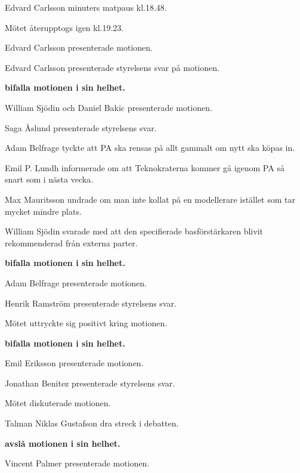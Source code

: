 \documentclass[10pt]{article}
\begin{document}
\begin{paragrafer}
\Mbaby

Edvard Carlsson  minuters matpaus kl.18.48. 

\Mbaby

Mötet återupptogs igen kl.19.23.

  \begin{paragrafer}
    Edvard Carlsson presenterade motionen.

    Edvard Carlsson presenterade styrelsens svar på motionen. 

    \textbf{\Mba bifalla motionen i sin helhet.}

    William Sjödin och Daniel Bakic presenterade motionen.

    Saga Åslund presenterade styrelsens svar. 

    Adam Belfrage tyckte att PA ska rensas på allt gammalt om nytt ska köpas in.

    Emil P. Lundh informerade om att Teknokraterna kommer gå igenom PA så snart som i nästa vecka.

    Max Mauritsson undrade om man inte kollat på en modellerare istället som tar mycket mindre plats.

    William Sjödin svarade med att den specifierade basförstärkaren blivit rekommenderad från externa parter.
    
    \textbf{\Mba bifalla motionen i sin helhet.}

    Adam Belfrage presenterade motionen.

    Henrik Ramström presenterade styrelsens svar.

    Mötet uttryckte sig positivt kring motionen.

    \textbf{\Mba bifalla motionen i sin helhet.}

    Emil Eriksson presenterade motionen.

    Jonathan Benitez presenterade styrelsens svar.

    Mötet diskuterade motionen.

    Talman Niklas Gustafson \ypa dra streck i debatten.

    \Mbaby

    \textbf{\Mba avslå motionen i sin helhet.}

    Vincent Palmer presenterade motionen.


\end{paragrafer}
\end{paragrafer}
\end{document}
